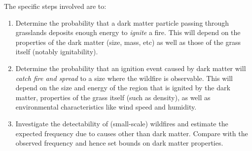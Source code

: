 \documentclass[%
 reprint,
 amsmath,amssymb,
 aps,nofootinbib
]{revtex4-1}
\begin{document}
The specific steps involved are to: \begin{enumerate}
    \item Determine the probability that a dark matter particle passing through grasslands deposits enough energy to \emph{ignite} a fire. This will depend on the properties of the dark matter (size, mass, etc) as well as those of the grass itself (notably ignitability).
    \item Determine the probability that an ignition event caused by dark matter will \emph{catch fire and spread} to a size where the wildfire is observable. This will depend on the size and energy of the region that is ignited by the dark matter, properties of the grass itself (such as density), as well as environmental characteristics like wind speed and humidity.
    \item Investigate the detectability of (small-scale) wildfires and estimate the expected frequency due to causes other than dark matter. Compare with the observed frequency and hence set bounds on dark matter properties.
\end{enumerate}





\newpage


% 
\end{document}
